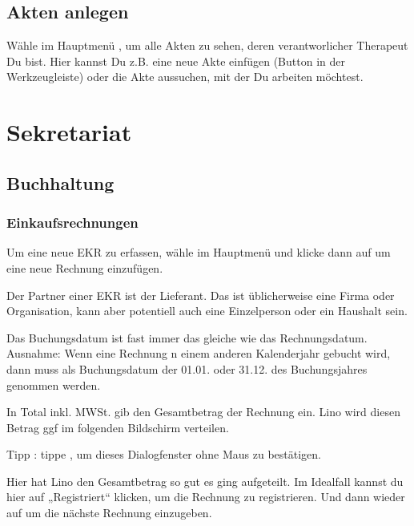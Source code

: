 \documentclass[letterpaper,10pt,ngerman]{sphinxmanual}
\begin{document}
\section{Akten anlegen}
\label{\detokenize{the/index:akten-anlegen}}
Wähle im Hauptmenü , um alle
Akten zu sehen, deren verantworlicher Therapeut Du bist.  Hier kannst
Du z.B. eine neue Akte einfügen (Button  in der
Werkzeugleiste) oder die Akte aussuchen, mit der Du arbeiten möchtest.


\chapter{Sekretariat}
\label{\detokenize{sek/index:sekretariat}}\label{\detokenize{sek/index::doc}}

\section{Buchhaltung}
\label{\detokenize{sek/ledger:buchhaltung}}\label{\detokenize{sek/ledger::doc}}

\subsection{Einkaufsrechnungen}
\label{\detokenize{sek/ledger:einkaufsrechnungen}}
Um eine neue EKR zu erfassen, wähle im Hauptmenü
 und
klicke dann auf  um eine neue Rechnung einzufügen.

Der Partner einer EKR ist der Lieferant. Das ist üblicherweise eine
Firma oder Organisation, kann aber potentiell auch eine Einzelperson
oder ein Haushalt sein.

Das Buchungsdatum ist fast immer das gleiche wie das
Rechnungsdatum. Ausnahme: Wenn eine Rechnung n einem anderen
Kalenderjahr gebucht wird, dann muss als Buchungsdatum der 01.01. oder
31.12. des Buchungsjahres genommen werden.

In Total inkl. MWSt. gib den Gesamtbetrag der Rechnung ein. Lino wird
diesen Betrag ggf im folgenden Bildschirm verteilen.

Tipp : tippe , um dieses Dialogfenster ohne Maus zu
bestätigen.

Hier hat Lino den Gesamtbetrag so gut es ging aufgeteilt. Im Idealfall
kannst du hier auf „Registriert“ klicken, um die Rechnung zu
registrieren. Und dann wieder auf um die nächste Rechnung einzugeben.
\end{document}
